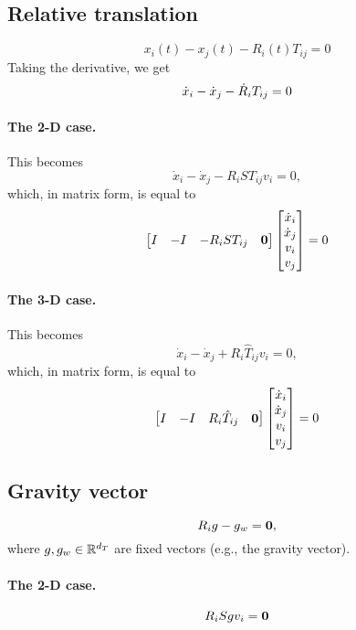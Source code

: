 \documentclass[12pt]{article}
\newcommand{\dx}{\dot{x}}
\begin{document}
\subsection{Relative translation}
\begin{equation}
    x_i(t)-x_j(t)-R_i(t)T_{ij}=0
\end{equation}
Taking the derivative, we get
\begin{equation}
  \dx_i-\dx_j-\dR_iT_{ij}=0  
\end{equation}
\paragraph{The 2-D case.} This becomes
\begin{equation}
    \dx_i-\dx_j-R_iST_{ij}v_i=0,
\end{equation}
which, in matrix form, is equal to
\begin{equation}
  \bmat{I & -I & -R_iST_{ij} & \vct{0}}\bmat{\dx_i\\\dx_j\\v_i\\v_j}=0
\end{equation}
\paragraph{The 3-D case.} This becomes
\begin{equation}
    \dx_i-\dx_j+R_i\hat{T}_{ij}v_i=0,
\end{equation}
which, in matrix form, is equal to
\begin{equation}
  \bmat{I & -I & R_i\hat{T}_{ij} & \vct{0}}\bmat{\dx_i\\\dx_j\\v_i\\v_j}=0
\end{equation}
\subsection{Gravity vector}
\begin{equation}
  R_ig-g_w=\boldsymbol{0},  
\end{equation}
where $g,g_w\in\mathbb{R}^{d_T}{}$ are fixed vectors (e.g., the gravity vector).

\paragraph{The 2-D case.}
\begin{equation}
  R_iSg v_i=\boldsymbol{0}
\end{equation}
\end{document}
